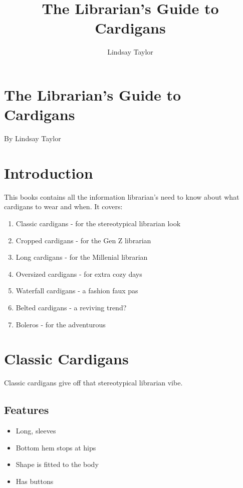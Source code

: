 \documentclass[
  openany]{book}
\title{The Librarian's Guide to Cardigans}
\author{Lindsay Taylor}
\date{}
\providecommand{\tightlist}{%
  \setlength{\itemsep}{0pt}\setlength{\parskip}{0pt}}
\begin{document}
\maketitle

{
\setcounter{tocdepth}{1}
\tableofcontents
}
\hypertarget{the-librarians-guide-to-cardigans}{%
\chapter{The Librarian's Guide to Cardigans}\label{the-librarians-guide-to-cardigans}}

By Lindsay Taylor

\hypertarget{introduction}{%
\chapter{Introduction}\label{introduction}}

This books contains all the information librarian's need to know about what cardigans to wear and when. It covers:

\begin{enumerate}
\def\labelenumi{\arabic{enumi}.}
\tightlist
\item
  Classic cardigans - for the stereotypical librarian look
\item
  Cropped cardigans - for the Gen Z librarian
\item
  Long cardigans - for the Millenial librarian
\item
  Oversized cardigans - for extra cozy days
\item
  Waterfall cardigans - a fashion faux pas
\item
  Belted cardigans - a reviving trend?
\item
  Boleros - for the adventurous
\end{enumerate}

\hypertarget{classic-cardigans}{%
\chapter{Classic Cardigans}\label{classic-cardigans}}

Classic cardigans give off that stereotypical librarian vibe.

\hypertarget{features}{%
\section{Features}\label{features}}

\begin{itemize}
\tightlist
\item
  Long, sleeves
\item
  Bottom hem stops at hips
\item
  Shape is fitted to the body
\item
  Has buttons
\end{itemize}
\end{document}
